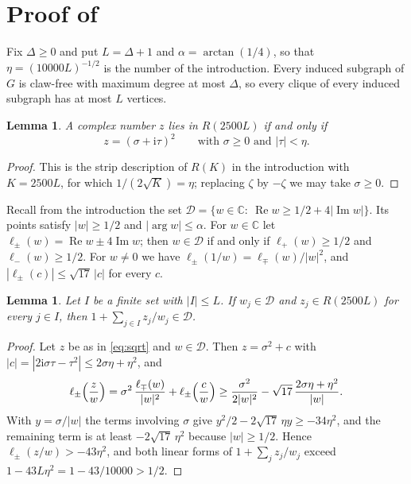 \documentclass[11pt]{article}
\newtheorem{lemma}[theorem]{Lemma}
\theoremstyle{remark}
\renewcommand{\Re}{\operatorname{Re}}
\renewcommand{\Im}{\operatorname{Im}}
\newcommand{\D}{\mathcal D}
\begin{document}
\section{Proof of \texorpdfstring{}{Theorem 1.1}}\label{sec:main}

Fix $\Delta\ge0$ and put $L=\Delta+1$ and $\alpha=\arctan(1/4)$, so that $\eta=(10000L)^{-1/2}$ is the number of the
introduction. Every induced subgraph of
$G$ is claw-free with maximum degree at most $\Delta$, so every clique of every induced subgraph has at most $L$
vertices.

\begin{lemma}\label{lem:sqrt}
A complex number $z$ lies in $R(2500L)$ if and only if
\begin{equation}\label{eq:sqrt}
z=(\sigma+\mathrm i\tau)^2\qquad\text{with }\sigma\ge0\text{ and }|\tau|<\eta .
\end{equation}
\end{lemma}

\begin{proof}
This is the strip description of $R(K)$ in the introduction with $K=2500L$, for which $1/(2\sqrt K)=\eta$;
replacing $\zeta$ by $-\zeta$ we may take $\sigma\ge0$.
\end{proof}

Recall from the introduction the set $\D=\{w\in\mathbb C:\ \Re w\ge1/2+4|\Im w|\}$. Its points satisfy $|w|\ge1/2$ and
$|\arg w|\le\alpha$. For $w\in\mathbb C$ let $\ell_\pm(w)=\Re w\pm4\Im w$; then $w\in\D$ if and only if
$\ell_+(w)\ge1/2$ and $\ell_-(w)\ge1/2$. For $w\ne0$ we have $\ell_\pm(1/w)=\ell_\mp(w)/|w|^2$, and
$|\ell_\pm(c)|\le\sqrt{17}\,|c|$ for every $c$.

\begin{lemma}\label{lem:D}
Let $I$ be a finite set with $|I|\le L$. If $w_j\in\D$ and $z_j\in R(2500L)$ for every $j\in I$, then
$1+\sum_{j\in I}z_j/w_j\in\D$.
\end{lemma}

\begin{proof}
Let $z$ be as in \eqref{eq:sqrt} and $w\in\D$. Then $z=\sigma^2+c$ with
$|c|=|2\mathrm i\sigma\tau-\tau^2|\le2\sigma\eta+\eta^2$, and
\[
\ell_\pm\Bigl(\frac zw\Bigr)=\sigma^2\,\frac{\ell_\mp(w)}{|w|^2}+\ell_\pm\Bigl(\frac cw\Bigr)
\ge\frac{\sigma^2}{2|w|^2}-\sqrt{17}\,\frac{2\sigma\eta+\eta^2}{|w|}.
\]
With $y=\sigma/|w|$ the terms involving $\sigma$ give $y^2/2-2\sqrt{17}\,\eta y\ge-34\eta^2$, and the remaining term
is at least $-2\sqrt{17}\,\eta^2$ because $|w|\ge1/2$. Hence $\ell_\pm(z/w)>-43\eta^2$, and both linear forms of
$1+\sum_j z_j/w_j$ exceed $1-43L\eta^2=1-43/10000>1/2$.
\end{proof}
\end{document}
